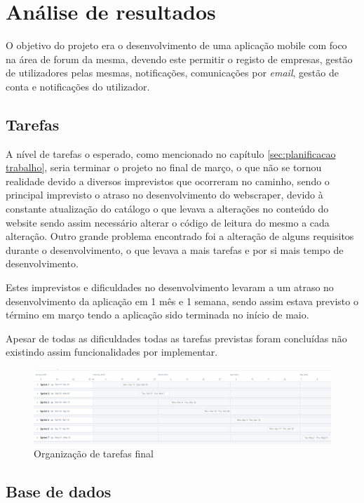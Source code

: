 \chapter{Análise de resultados}
 O objetivo do projeto era o desenvolvimento de uma aplicação mobile com foco na área de forum da mesma, devendo este permitir o registo de empresas, gestão de utilizadores pelas mesmas, notificações, comunicações por \textit{email}, gestão de conta e notificações do utilizador.

 \section{Tarefas}

A nível de tarefas o esperado, como mencionado no capítulo \ref{sec:planificacao trabalho}, seria terminar o projeto no final de março, o que não se tornou realidade devido a diversos imprevistos que ocorreram no caminho, sendo o principal imprevisto o atraso no desenvolvimento do webscraper, devido à constante atualização do catálogo o que levava a alterações no conteúdo do website sendo assim necessário alterar o código de leitura do mesmo a cada alteração. Outro grande problema encontrado foi a alteração de alguns requisitos durante o desenvolvimento, o que levava a mais tarefas e por si mais tempo de desenvolvimento.

Estes imprevistos e dificuldades no desenvolvimento levaram a um atraso no desenvolvimento da aplicação em 1 mês e 1 semana, sendo assim estava previsto o término em março tendo a aplicação sido terminada no início de maio.

Apesar de todas as dificuldades todas as tarefas previstas foram concluídas não existindo assim funcionalidades por implementar.

\begin{figure}[htb]
  \centering
  \includegraphics[width=\textwidth]{images/analise_resultados/planeamento_final.png}
  \caption{Organização de tarefas final}
  \label{fig:78}
\end{figure}

\newpage

\section{Base de dados}

